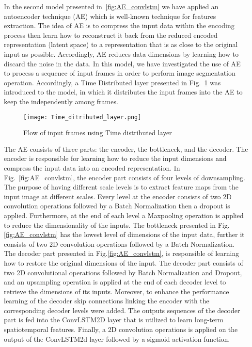 In the second model presented in~\ref{fig:AE_convlstm} we have applied an autoencoder technique (AE) which is well-known technique for features extraction.
The idea of AE is to compress the input data within the encoding process then learn how to reconstruct it back from the reduced encoded representation (latent space) to a representation that is as close to the original input as possible. 
Accordingly, AE reduces data dimensions by learning how to discard the noise in the data.
In this model, we have investigated the use of AE to process a sequence of input frames in order to perform image segmentation operation.
Accordingly, a Time Distributed layer presented in Fig.~\ref{fig:TD} was introduced to the model, in which it distributes the input frames into the AE to keep the independently among frames.
\begin{figure}[!h]
	\centering
	\texttt{[image: Time\_ditributed\_layer.png]}
	\caption{Flow of input frames using Time distributed layer}
	\label{fig:TD}
\end{figure}

The AE consists of three parts: the encoder, the bottleneck, and the decoder.
The encoder is responsible for learning how to reduce the input dimensions and compress the input data into an encoded representation.
In Fig.~\ref{fig:AE_convlstm}, the encoder part consists of four levels of downsampling. 
The purpose of having different scale levels is to extract feature maps from the input image at different scales.
Every level at the encoder consists of two 2D convolution operations followed by a Batch Normalization then a dropout is applied. 
Furthermore, at the end of each level a Maxpooling operation is applied to reduce the dimensionality of the inputs. 
The bottleneck presented in Fig.\ref{fig:AE_convlstm} has the lowest level of dimensions of the input data, further it consists of two 2D convolution operations followed by a Batch Normalization.
The decoder part presented in Fig.\ref{fig:AE_convlstm}, is responsible of learning how to restore the original dimensions of the input.
The decoder part consists of two 2D convolutional operations followed by Batch Normalization and Dropout, and an upsampling operation is applied at the end of each decoder level to retrieve the dimensions of its inputs.
Moreover, to enhance the performance learning of the decoder skip connections linking the encoder with the corresponding decoder levels were added.
The outputs sequences of the decoder part is fed into the ConvLSTM2D layer that is utilized to learn long-term spatiotemporal features.
Finally, a 2D convolution operations is applied on the output of the ConvLSTM2d layer followed by a sigmoid activation function.